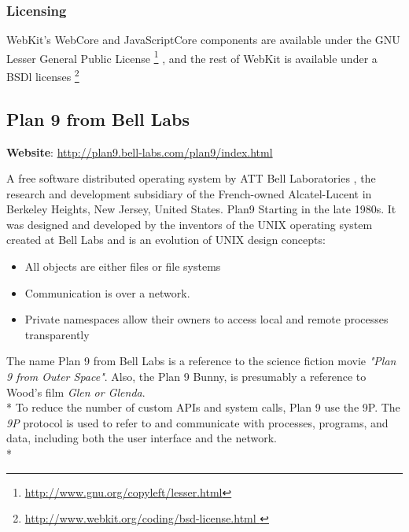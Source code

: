 \documentclass[11pt]{article} %
\begin{document}
\subsubsection{Licensing}
WebKit's WebCore and JavaScriptCore components are available under the GNU Lesser General Public License  \footnote{\url{http://www.gnu.org/copyleft/lesser.html}} , and the rest of WebKit is available under a BSDl licenses \footnote{\url{http://www.webkit.org/coding/bsd-license.html }}

\subsection{Plan 9 from Bell Labs} %

\textbf{Website}: \url {http://plan9.bell-labs.com/plan9/index.html}

A free software distributed operating system by ATT Bell Laboratories , the research and development subsidiary of the French-owned Alcatel-Lucent in Berkeley Heights, New Jersey, United States. Plan9 Starting in the late 1980s. It was designed and developed by the inventors of the UNIX operating system created at Bell Labs and is an evolution of UNIX design concepts:
\begin{itemize}
\item All objects are either files or file systems
\item Communication is over a network.
\item Private namespaces allow their owners to access local and remote processes transparently
\end{itemize}
The name Plan 9 from Bell Labs is a reference to the science fiction movie \emph{"Plan 9 from Outer Space"}. Also, the Plan 9 Bunny, is presumably a reference to Wood's film \emph{Glen or Glenda}.\\*
To reduce the number of custom APIs and system calls, Plan 9 use the 9P. The \emph{9P} protocol is used to refer to and communicate with processes, programs, and data, including both the user interface and the network.\\*
\end{document}
